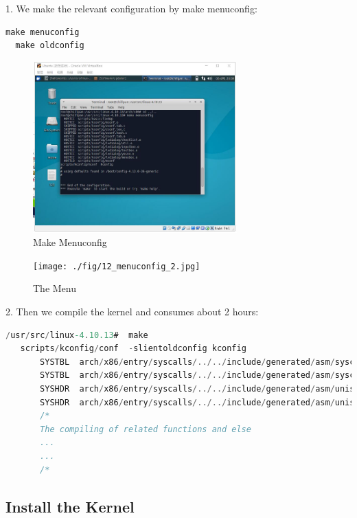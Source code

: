 \documentclass[12pt,a4paper]{article}
\begin{document}
1. We make the relevant configuration by make menuconfig:
\begin{lstlisting}[language = C]
  make menuconfig 
  make oldconfig
\end{lstlisting}

\begin{minipage}{0.5\textwidth}
\begin{figure}[H]
	\centering
	\includegraphics[width= 0.7\textwidth]{./fig/12_menuconfig.jpg}
	\caption{Make Menuconfig}
\end{figure}
\end{minipage}
\begin{minipage}{0.5\textwidth}
\begin{figure}[H]
	\centering
	\texttt{[image: ./fig/12\_menuconfig\_2.jpg]}
	\caption{The Menu}
\end{figure}
\end{minipage}

2. Then we compile the kernel and consumes about 2 hours:
\begin{lstlisting}[language = C]
   /usr/src/linux-4.10.13#  make 
   scripts/kconfig/conf  -slientoldconfig kconfig
       SYSTBL  arch/x86/entry/syscalls/../../include/generated/asm/syscalls_32.h
       SYSTBL  arch/x86/entry/syscalls/../../include/generated/asm/syscalls_32.h
       SYSHDR  arch/x86/entry/syscalls/../../include/generated/asm/unistd_ia32.h
       SYSHDR  arch/x86/entry/syscalls/../../include/generated/asm/unistd_x32.h
       /*
       The compiling of related functions and else
       ...
       ...
       /*
\end{lstlisting}

\subsection{Install the Kernel}
\end{document}
